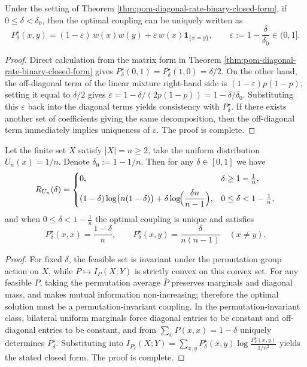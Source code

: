 \begin{corollary}\label{cor:pom-diagonal-rate-binary-linear-mixture}
Under the setting of Theorem \ref{thm:pom-diagonal-rate-binary-closed-form}, if \(0\le\delta<\delta_0\), then the optimal coupling can be uniquely written as
\[
P^\star_\delta(x,y)=(1-\varepsilon)\,w(x)w(y)+\varepsilon\,w(x)\mathbf 1_{\{x=y\}},
\qquad
\varepsilon:=1-\frac{\delta}{\delta_0}\in(0,1].
\]
\end{corollary}
\begin{proof}
Direct calculation from the matrix form in Theorem \ref{thm:pom-diagonal-rate-binary-closed-form} gives
\(
P^\star_\delta(0,1)=P^\star_\delta(1,0)=\delta/2
\).
On the other hand, the off-diagonal term of the linear mixture right-hand side is \((1-\varepsilon)p(1-p)\), setting it equal to \(\delta/2\) gives \(\varepsilon=1-\delta/(2p(1-p))=1-\delta/\delta_0\).
Substituting this \(\varepsilon\) back into the diagonal terms yields consistency with \(P^\star_\delta\).
If there exists another set of coefficients giving the same decomposition, then the off-diagonal term immediately implies uniqueness of \(\varepsilon\). The proof is complete.
\end{proof}

\begin{theorem}\label{thm:pom-diagonal-rate-uniform-closed-form}
Let the finite set \(X\) satisfy \(|X|=n\ge 2\), take the uniform distribution \(U_n(x)=1/n\).
Denote \(\delta_0:=1-1/n\).
Then for any \(\delta\in[0,1]\) we have
\[
R_{U_n}(\delta)=
\begin{cases}
0, & \delta\ge 1-\frac{1}{n},\\[6pt]
(1-\delta)\log\bigl(n(1-\delta)\bigr)+\delta\log\!\Bigl(\dfrac{\delta n}{n-1}\Bigr), & 0\le\delta<1-\frac{1}{n},
\end{cases}
\]
and when \(0\le\delta<1-\frac1n\) the optimal coupling is unique and satisfies
\[
P^\star_\delta(x,x)=\frac{1-\delta}{n},\qquad
P^\star_\delta(x,y)=\frac{\delta}{n(n-1)}\quad(x\ne y).
\]
\end{theorem}
\begin{proof}
For fixed \(\delta\), the feasible set is invariant under the permutation group action on \(X\), while \(P\mapsto I_P(X;Y)\) is strictly convex on this convex set.
For any feasible \(P\), taking the permutation average \(\bar P\) preserves marginals and diagonal mass, and makes mutual information non-increasing; therefore the optimal solution must be a permutation-invariant coupling.
In the permutation-invariant class, bilateral uniform marginals force diagonal entries to be constant and off-diagonal entries to be constant, and from \(\sum_x P(x,x)=1-\delta\) uniquely determines \(P^\star_\delta\).
Substituting into
\(
I_{P^\star_\delta}(X;Y)=\sum_{x,y}P^\star_\delta(x,y)\log\frac{P^\star_\delta(x,y)}{1/n^2}
\)
yields the stated closed form. The proof is complete.
\end{proof}

